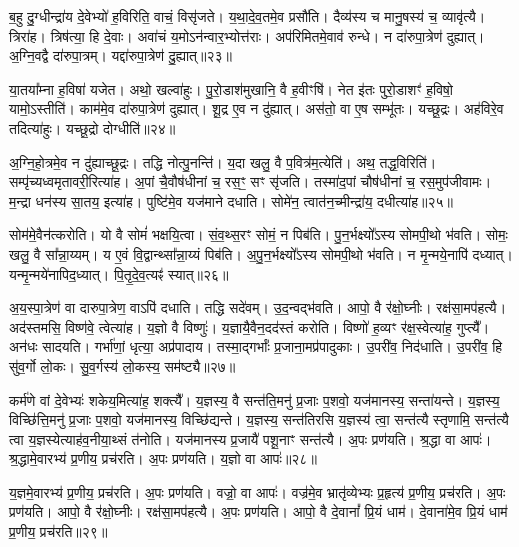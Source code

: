 ब॒हु दु॒ग्धीन्द्रा॑य दे॒वेभ्यो॑ ह॒विरिति॒ वाचं॒ विसृ॑जते।
य॒था॒दे॒व॒तमे॒व प्रसौ॑ति।
दैव्य॑स्य च मानु॒षस्य॑ च॒ व्यावृ॑त्यै।
त्रिरा॑ह।
त्रिष॑त्या॒ हि दे॒वाः।
अवा॑चं य॒मो\-ऽन॑न्वार॒भ्योत्त॑राः।
अप॑रिमितमे॒वाव॑ रुन्धे।
न दा॑रुपा॒त्रेण॑ दुह्यात्।
अ॒ग्नि॒वद्वै दा॑रुपा॒त्रम्।
यद्दा॑रुपा॒त्रेण॑ दु॒ह्यात्॥२३॥

या॒तया᳚म्ना ह॒विषा॑ यजेत।
अथो॒ खल्वा॑हुः।
पु॒रो॒डाश॑मुखानि॒ वै ह॒वीꣳषि॑।
नेत इ॑तः पुरो॒डाशꣳ॑ ह॒विषो॒ यामो॒\-ऽस्तीति॑।
काम॑मे॒व दा॑रुपा॒त्रेण॑ दुह्यात्।
शू॒द्र ए॒व न दु॑ह्यात्।
अस॑तो॒ वा ए॒ष सम्भू॑तः।
यच्छू॒द्रः।
अह॑विरे॒व तदित्या॑हुः।
यच्छू॒द्रो दोग्धीति॑॥२४॥

अ॒ग्नि॒हो॒त्रमे॒व न दु॑ह्याच्छू॒द्रः।
तद्धि नोत्पु॒नन्ति॑।
य॒दा खलु॒ वै प॒वित्र॑म॒त्येति॑।
अथ॒ तद्ध॒विरिति॑।
सम्पृ॑च्यध्वमृतावरी॒रित्या॑ह।
अ॒पां चै॒वौष॑धीनां च॒ रस॒ꣳ॒ सꣳ सृ॑जति।
तस्मा॑द॒पां चौष॑धीनां च॒ रस॒मुप॑जीवामः।
म॒न्द्रा धन॑स्य सा॒तय॒ इत्या॑ह।
पुष्टि॑मे॒व यज॑माने दधाति।
सोमे॑न॒ त्वात॑न॒च्मीन्द्रा॑य॒ दधीत्या॑ह॥२५॥

सोम॑मे॒वैन॑त्करोति।
यो वै सोमं॑ भक्षयि॒त्वा।
सं॒व॒थ्स॒रꣳ सोमं॒ न पिब॑ति।
पु॒न॒र्भक्ष्यो᳚ऽस्य सोमपी॒थो भ॑वति।
सोमः॒ खलु॒ वै सा᳚न्ना॒य्यम्।
य ए॒वं वि॒द्वान्थ्सा᳚न्ना॒य्यं पिब॑ति।
अ॒पु॒न॒र्भक्ष्यो᳚ऽस्य सोमपी॒थो भ॑वति।
न मृ॒न्मये॒नापि॑ दध्यात्।
यन्मृ॒न्मये॑नापिद॒ध्यात्।
पि॒तृ॒दे॒व॒त्यꣴ॑ स्यात्॥२६॥

अ॒य॒स्पा॒त्रेण॑ वा दारुपा॒त्रेण॒ वाऽपि॑ दधाति।
तद्धि सदे॑वम्।
उ॒द॒न्वद्भ॑वति।
आपो॒ वै र॑क्षो॒घ्नीः।
रक्ष॑सा॒मप॑हत्यै।
अद॑स्तमसि॒ विष्ण॑वे॒ त्वेत्या॑ह।
य॒ज्ञो वै विष्णुः॑।
य॒ज्ञायै॒वैन॒दद॑स्तं करोति।
विष्णो॑ ह॒व्यꣳ र॑क्ष॒स्वेत्या॑ह॒ गुप्त्यै᳚।
अन॑धः सादयति।
गर्भा॑णां॒ धृत्या॒ अप्र॑पादाय।
तस्मा॒द्गर्भाः᳚ प्र॒जाना॒मप्र॑पादुकाः।
उ॒परी॑व॒ निद॑धाति।
उ॒परी॑व॒ हि सु॑व॒र्गो लो॒कः।
सु॒व॒र्गस्य॑ लो॒कस्य॒ सम॑ष्ट्यै॥२७॥

कर्म॑णे वां दे॒वेभ्यः॑ शकेय॒मित्या॑ह॒ शक्त्यै᳚।
य॒ज्ञस्य॒ वै सन्त॑ति॒मनु॑ प्र॒जाः प॒शवो॒ यज॑मानस्य॒ सन्ता॑यन्ते।
य॒ज्ञस्य॒ विच्छि॑त्ति॒मनु॑ प्र॒जाः प॒शवो॒ यज॑मानस्य॒ विच्छि॑द्यन्ते।
य॒ज्ञस्य॒ सन्त॑तिरसि य॒ज्ञस्य॑ त्वा॒ सन्त॑त्यै स्तृणामि॒ सन्त॑त्यै त्वा य॒ज्ञस्येत्याह॑व॒नीया॒थ्सं त॑नोति।
यज॑\-मानस्य प्र॒जायै॑ पशू॒नाꣳ सन्त॑त्यै।
अ॒पः प्रण॑यति।
श्र॒द्धा वा आपः॑।
श्र॒द्धामे॒वारभ्य॑ प्र॒णीय॒ प्रच॑रति।
अ॒पः प्रण॑यति।
य॒ज्ञो वा आपः॑॥२८॥

य॒ज्ञमे॒वारभ्य॑ प्र॒णीय॒ प्रच॑रति।
अ॒पः प्रण॑यति।
वज्रो॒ वा आपः॑।
वज्र॑मे॒व भ्रातृ॑व्येभ्यः प्र॒हृत्य॑ प्र॒णीय॒ प्रच॑रति।
अ॒पः प्रण॑यति।
आपो॒ वै र॑क्षो॒घ्नीः।
रक्ष॑सा॒मप॑हत्यै।
अ॒पः प्रण॑यति।
आपो॒ वै दे॒वानां᳚ प्रि॒यं धाम॑।
दे॒वाना॑मे॒व प्रि॒यं धाम॑ प्र॒णीय॒ प्रच॑रति॥२९॥


